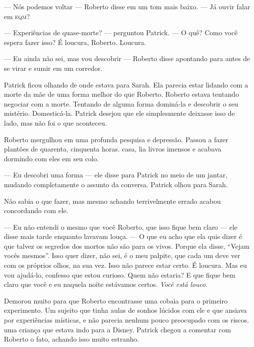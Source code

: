 --- Nós podemos voltar --- Roberto disse em um tom mais baixo. --- Já ouvir falar em \textsc{eqm}?

--- Experiências de quase-morte? --- perguntou Patrick. --- O quê? Como você espera fazer isso? É loucura, Roberto. Loucura.

--- Eu ainda não sei, mas vou descobrir --- Roberto disse\mudanca{,} apontando para  antes de se virar e sumir em um corredor.

Patrick ficou olhando de onde estava para Sarah. Ela parecia estar lidando com a morte da mãe de uma forma melhor do que Roberto. Roberto estava tentando negociar com a morte. Tentando de alguma forma dominá-la e descobrir o seu mistério. Domesticá-la. Patrick desejou que ele simplesmente deixasse isso de lado, mas não foi o que aconteceu.

\begin{sloppypar}
Roberto mergulhou em uma profunda pesquisa e depressão. Passou a fazer plantões de quarenta, cinquenta horas.  casa, lia livros imensos e acabava dormindo com eles em seu colo.
\end{sloppypar}

--- Eu descobri uma forma --- ele disse para Patrick no meio de um jantar, mudando completamente o assunto da conversa. Patrick olhou para Sarah.

Não sabia o que fazer, mas\mudanca{,} mesmo achando terrivelmente errado\mudanca{,} acabou concordando com ele.

--- Eu não entendi o mesmo que você Roberto, que isso fique bem claro --- ele disse mais tarde enquanto lavavam louça. --- O que eu acho que ela quis dizer é que talvez os segredos dos mortos não são para os vivos. Porque ela disse, ``Vejam vocês mesmos''. Isso quer dizer, não sei, é o meu palpite, que cada um deve ver com os próprios olhos, na sua vez. Isso não parece estar certo. É loucura. Mas eu vou ajudá-lo, confesso que estou curioso. Quem não estaria? E que fique bem claro que você e eu naquela noite estávamos certos. \emph{Você está louco}.

Demorou muito para que Roberto encontrasse uma cobaia para o primeiro experimento. Um sujeito que tinha aulas de sonhos lúcidos com ele e que ansiava por experiências místicas, e não parecia nenhum pouco preocupado com os riscos.  uma criança que estava indo para a Disney. Patrick chegou a comentar com Roberto o fato, achando isso muito estranho.

